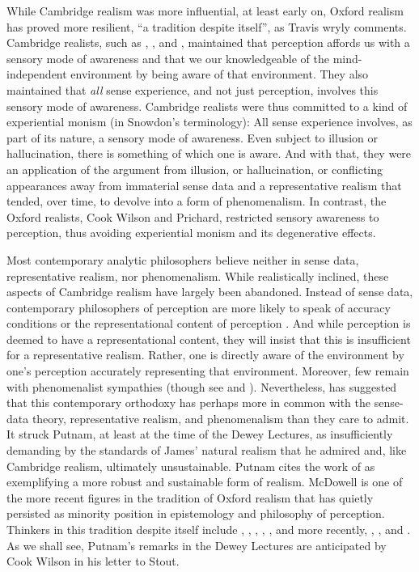 \documentclass[12pt]{article}
\begin{document}
While Cambridge realism was more influential, at least early on, Oxford realism has proved more resilient, ``a tradition despite itself'', as Travis wryly comments. Cambridge realists, such as \cite{Russell:1912uq}, \citet{Moore:1953nx}, and \citet{Price:1932fk}, maintained that perception affords us with a sensory mode of awareness and that we our knowledgeable of the mind-independent environment by being aware of that environment. They also maintained that \emph{all} sense experience, and not just perception, involves this sensory mode of awareness. Cambridge realists were thus committed to a kind of experiential monism (in Snowdon's \citeyear{Snowdon:2008oz} terminology): All sense experience involves, as part of its nature, a sensory mode of awareness. Even subject to illusion or hallucination, there is something of which one is aware. And with that, they were an application of the argument from illusion, or hallucination, or conflicting appearances away from immaterial sense data and a representative realism that tended, over time, to devolve into a form of phenomenalism. In contrast, the Oxford realists, Cook Wilson and Prichard, restricted sensory awareness to perception, thus avoiding experiential monism and its degenerative effects. 

Most contemporary analytic philosophers believe neither in sense data, representative realism, nor phenomenalism. While realistically inclined, these aspects of Cambridge realism have largely been abandoned. Instead of sense data, contemporary philosophers of perception are more likely to speak of accuracy conditions or the representational content of perception \citep[though see][]{Robinson:1994ms}. And while perception is deemed to have a representational content, they will insist that this is insufficient for a representative realism. Rather, one is directly aware of the environment by one's perception accurately representing that environment. Moreover, few remain with phenomenalist sympathies (though see \citealt{Foster:2000ny} and \citealt{Noe:2004fk}). Nevertheless, \citet{Putnam:1994kx} has suggested that this contemporary orthodoxy has perhaps more in common with the sense-data theory, representative realism, and phenomenalism than they care to admit. It struck Putnam, at least at the time of the Dewey Lectures, as insufficiently demanding by the standards of James' natural realism that he admired and, like Cambridge realism, ultimately unsustainable. Putnam cites the work of \citet{McDowell:1994am} as exemplifying a more robust and sustainable form of realism. McDowell is one of the more recent figures in the tradition of Oxford realism that has quietly persisted as minority position in epistemology and philosophy of perception. Thinkers in this tradition despite itself include \citet{Cook-Wilson:1926sf}, \citet{Prichard:1950tg}, \citet{Ryle:1949qr}, \citet{Austin:1946ao,Austin:1962lr}, \citet{Hinton:1973js}, and more recently, \citet{McDowell:1994am}, \citet{Williamson:2000lr}, and \citet{Travis:2008la}. As we shall see, Putnam's remarks in the Dewey Lectures are anticipated by Cook Wilson in his letter to Stout.
\end{document}
